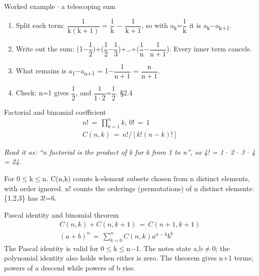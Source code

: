 \documentclass[11pt]{article}
\begin{document}
\begin{keepsection}
\begin{workedbox}{Worked example \ensuremath{\cdot} a telescoping sum}
\begin{enumerate}
\item Split each term: {\small\ensuremath{\dfrac{1}{\mathrm{k}(\mathrm{k}+1)}}} = {\small\ensuremath{\dfrac{1}{\mathrm{k}}}} \ensuremath{-} {\small\ensuremath{\dfrac{1}{\mathrm{k}+1}}}, so with a\textsubscript{k}={\small\ensuremath{\dfrac{1}{\mathrm{k}}}} it is a\textsubscript{k}\ensuremath{-}a\textsubscript{k+1}.
\item Write out the sum: (1\ensuremath{-}{\small\ensuremath{\dfrac{1}{2}}})+({\small\ensuremath{\dfrac{1}{2}}}\ensuremath{-}{\small\ensuremath{\dfrac{1}{3}}})+…+({\small\ensuremath{\dfrac{1}{\mathrm{n}}}}\ensuremath{-}{\small\ensuremath{\dfrac{1}{\mathrm{n}+1}}}). Every inner term cancels.
\item What remains is a\textsubscript{1}\ensuremath{-}a\textsubscript{n+1} = 1\ensuremath{-}{\small\ensuremath{\dfrac{1}{\mathrm{n}+1}}} = {\small\ensuremath{\dfrac{\mathrm{n}}{\mathrm{n}+1}}}.
\item Check: n=1 gives {\small\ensuremath{\dfrac{1}{2}}}, and {\small\ensuremath{\dfrac{1}{1\cdot 2}}}={\small\ensuremath{\dfrac{1}{2}}}. \hfill{\small\color{FAUblue}§2.4}
\end{enumerate}
\end{workedbox}

\begin{equationcard}{Factorial and binomial coefficient}
\[ \begin{gathered} {n}!\, =\, \prod_{{k}=1}^{{n}} {k},\, 0!\, =\, 1 \\ {C}({n},{k})\, =\, {n}!/[{k}!({n}-{k})!] \end{gathered} \]
{\small \emph{Read it as: “n factorial is the product of k for k from 1 to n”, so 4! = 1 \ensuremath{\cdot} 2 \ensuremath{\cdot} 3 \ensuremath{\cdot} 4 = 24.}\par For 0\ensuremath{\leq}k\ensuremath{\leq}n. C(n,k) counts k-element subsets chosen from n distinct elements, with order ignored. n! counts the orderings (permutations) of n distinct elements: \{1,2,3\} has 3!=6.}
\end{equationcard}

\begin{equationcard}{Pascal identity and binomial theorem}
\[ \begin{gathered} {C}({n},{k})+{C}({n},{k}+1)\, =\, {C}({n}+1,{k}+1) \\ ({a}+{b})^{{n}}\, =\, \sum_{{k}=0}^{{n}} {C}({n},{k}){a}^{{n}-{k}}{b}^{{k}} \end{gathered} \]
{\small The Pascal identity is valid for 0\ensuremath{\leq}k\ensuremath{\leq}n\ensuremath{-}1. The notes state a,b\ensuremath{\neq}0; the polynomial identity also holds when either is zero. The theorem gives n+1 terms; powers of a descend while powers of b rise.}
\end{equationcard}


\end{keepsection}
\end{document}
